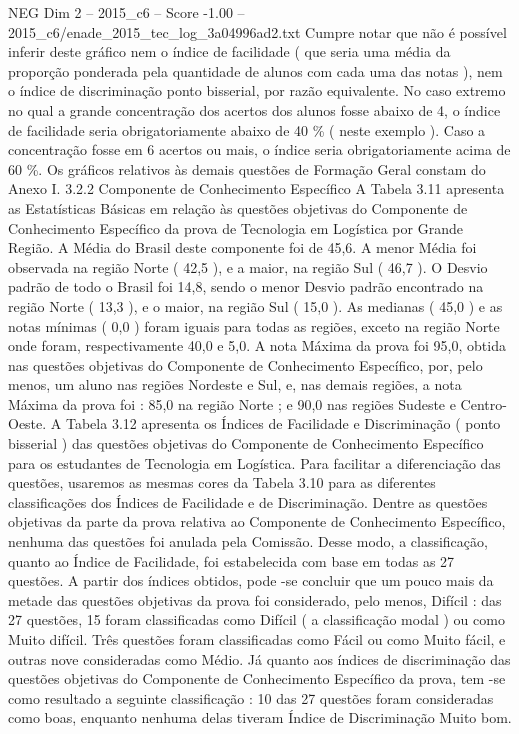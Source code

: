 \begin{textsample}{NEG Dim 2 – 2015\_c6 – Score -1.00 – 2015\_c6/enade\_2015\_tec\_log\_3a04996ad2.txt}
Cumpre notar que não é possível inferir deste gráfico nem o índice de facilidade ( que seria uma média da proporção ponderada pela quantidade de alunos com cada uma das notas ), nem o índice de discriminação ponto bisserial, por razão equivalente.
No caso extremo no qual a grande concentração dos acertos dos alunos fosse abaixo de 4, o índice de facilidade seria obrigatoriamente abaixo de 40 \% ( neste exemplo ).
Caso a concentração fosse em 6 acertos ou mais, o índice seria obrigatoriamente acima de 60 \%.
Os gráficos relativos às demais questões de Formação Geral constam do Anexo I. 3.2.2 Componente de Conhecimento Específico A Tabela 3.11 apresenta as Estatísticas Básicas em relação às questões objetivas do Componente de Conhecimento Específico da prova de Tecnologia em Logística por Grande Região.
A Média do Brasil deste componente foi de 45,6.
A menor Média foi observada na região Norte ( 42,5 ), e a maior, na região Sul ( 46,7 ).
O Desvio padrão de todo o Brasil foi 14,8, sendo o menor Desvio padrão encontrado na região Norte ( 13,3 ), e o maior, na região Sul ( 15,0 ).
As medianas ( 45,0 ) e as notas mínimas ( 0,0 ) foram iguais para todas as regiões, exceto na região Norte onde foram, respectivamente 40,0 e 5,0.
A nota Máxima da prova foi 95,0, obtida nas questões objetivas do Componente de Conhecimento Específico, por, pelo menos, um aluno nas regiões Nordeste e Sul, e, nas demais regiões, a nota Máxima da prova foi : 85,0 na região Norte ; e 90,0 nas regiões Sudeste e Centro-Oeste.
A Tabela 3.12 apresenta os Índices de Facilidade e Discriminação ( ponto bisserial ) das questões objetivas do Componente de Conhecimento Específico para os estudantes de Tecnologia em Logística.
Para facilitar a diferenciação das questões, usaremos as mesmas cores da Tabela 3.10 para as diferentes classificações dos Índices de Facilidade e de Discriminação.
Dentre as questões objetivas da parte da prova relativa ao Componente de Conhecimento Específico, nenhuma das questões foi anulada pela Comissão.
Desse modo, a classificação, quanto ao Índice de Facilidade, foi estabelecida com base em todas as 27 questões.
A partir dos índices obtidos, pode -se concluir que um pouco mais da metade das questões objetivas da prova foi considerado, pelo menos, Difícil : das 27 questões, 15 foram classificadas como Difícil ( a classificação modal ) ou como Muito difícil.
Três questões foram classificadas como Fácil ou como Muito fácil, e outras nove consideradas como Médio.
Já quanto aos índices de discriminação das questões objetivas do Componente de Conhecimento Específico da prova, tem -se como resultado a seguinte classificação : 10 das 27 questões foram consideradas como boas, enquanto nenhuma delas tiveram Índice de Discriminação Muito bom.

\end{textsample}
